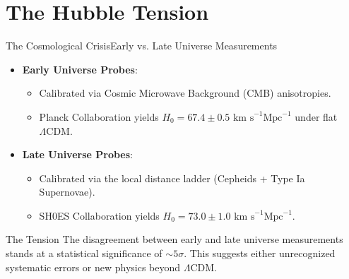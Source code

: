 \section{The Hubble Tension}

\begin{frame}{The Cosmological Crisis}{Early vs. Late Universe Measurements}
  \begin{itemize}
    \item \textbf{Early Universe Probes}:
    \begin{itemize}
      \item Calibrated via Cosmic Microwave Background (CMB) anisotropies.
      \item Planck Collaboration yields $H_0 = 67.4 \pm 0.5 \text{ km s}^{-1}\text{Mpc}^{-1}$ under flat $\Lambda\text{CDM}$.
    \end{itemize}
    \vspace{0.5em}
    \item \textbf{Late Universe Probes}:
    \begin{itemize}
      \item Calibrated via the local distance ladder (Cepheids + Type Ia Supernovae).
      \item SH0ES Collaboration yields $H_0 = 73.0 \pm 1.0 \text{ km s}^{-1}\text{Mpc}^{-1}$.
    \end{itemize}
  \end{itemize}
  \vspace{0.8em}
  \begin{block}{The Tension}
    The disagreement between early and late universe measurements stands at a statistical significance of $\sim 5\sigma$. This suggests either unrecognized systematic errors or new physics beyond $\Lambda\text{CDM}$.
  \end{block}
\end{frame}

